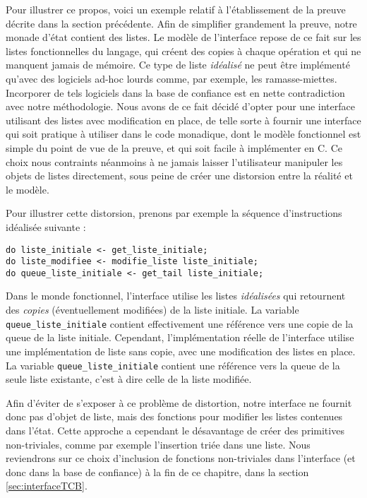 			Pour illustrer ce propos, voici un exemple relatif à l'établissement de la preuve décrite dans la section précédente. Afin de simplifier grandement la preuve, notre monade d'état contient des listes. Le modèle de l'interface repose de ce fait sur les listes fonctionnelles du langage, qui créent des copies à chaque opération et qui ne manquent jamais de mémoire. Ce type de liste \emph{idéalisé} ne peut être implémenté qu'avec des logiciels ad-hoc lourds comme, par exemple, les ramasse-miettes. Incorporer de tels logiciels dans la base de confiance est en nette contradiction avec notre méthodologie.
			Nous avons de ce fait décidé d'opter pour une interface utilisant des listes avec modification en place, de telle sorte à fournir une interface qui soit pratique à utiliser dans le code monadique, dont le modèle fonctionnel est simple du point de vue de la preuve, et qui soit facile à implémenter en C. Ce choix nous contraints néanmoins à ne jamais laisser l'utilisateur manipuler les objets de listes directement, sous peine de créer une distorsion entre la réalité et le modèle.

Pour illustrer cette distorsion, prenons par exemple la séquence d'instructions idéalisée suivante :
\begin{verbatim}
do liste_initiale <- get_liste_initiale;
do liste_modifiee <- modifie_liste liste_initiale;
do queue_liste_initiale <- get_tail liste_initiale;
\end{verbatim}

Dans le monde fonctionnel, l'interface utilise les listes \emph{idéalisées} qui retournent des \emph{copies} (éventuellement modifiées) de la liste initiale. La variable \texttt{queue\_liste\_initiale} contient effectivement une référence vers une copie de la queue de la liste initiale. Cependant, l'implémentation réelle de l'interface utilise une implémentation de liste sans copie, avec une modification des listes en place. La variable \texttt{queue\_liste\_initiale} contient une référence vers la queue de la seule liste existante, c'est à dire celle de la liste modifiée.

Afin d'éviter de s'exposer à ce problème de distortion, notre interface ne fournit donc pas d'objet de liste, mais des fonctions pour modifier les listes contenues dans l'état. Cette approche a cependant le désavantage de créer des primitives non-triviales, comme par exemple l'insertion triée dans une liste. Nous reviendrons sur ce choix d'inclusion de fonctions non-triviales dans l'interface (et donc dans la base de confiance) à la fin de ce chapitre, dans la section \ref{sec:interfaceTCB}. 
		
